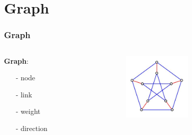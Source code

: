 \documentclass[notheorems,mathserif,table,compress]{beamer}  %
\begin{document}
\section{Graph}
\begin{frame}
    \frametitle{Graph}
    \begin{columns}
       \begin{column}[c]{0.5\textwidth}
          {\textbf{\Large Graph}}:\\
          \begin{itemize}
	  \item[-] node
	  \item[-] link
	  \item[-] weight
	  \item[-] direction
          \end{itemize}
      \end{column}
  
      \begin{column}[c]{0.5\textwidth}
          \begin{figure}[!ht]
          \centering
          \includegraphics[width=1.3in]{GRAPH.png}
          \end{figure}
     \end{column}
   \end{columns}
\end{frame}
\end{document}
